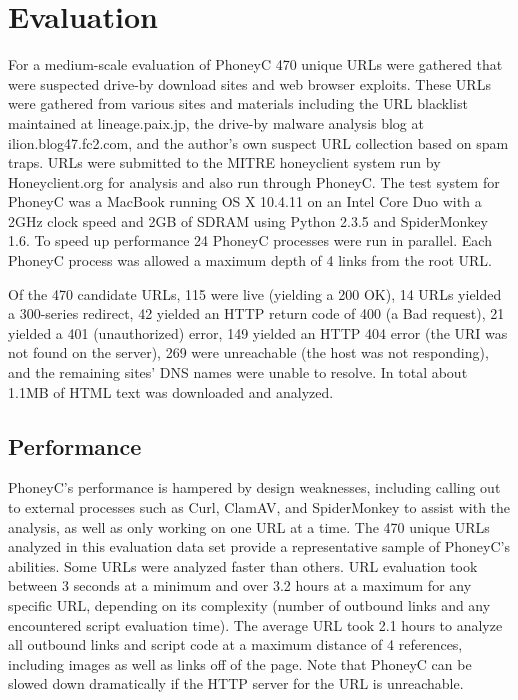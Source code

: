 \documentclass[10pt,twocolumn]{article}
\begin{document}
\section{Evaluation}
\label{evaluation}

For a medium-scale evaluation of PhoneyC 470 unique URLs were gathered that were suspected drive-by download sites and web browser exploits. These URLs were gathered from various sites and materials including the URL blacklist maintained at lineage.paix.jp, the drive-by malware analysis blog at ilion.blog47.fc2.com, and the author's own suspect URL collection based on spam traps. URLs were submitted to the MITRE honeyclient system run by Honeyclient.org for analysis and also run through PhoneyC. The test system for PhoneyC was a MacBook running OS X 10.4.11 on an Intel Core Duo with a 2GHz clock speed and 2GB of SDRAM using Python 2.3.5 and SpiderMonkey 1.6. To speed up performance 24 PhoneyC processes were run in parallel. Each PhoneyC process was allowed a maximum depth of 4 links from the root URL. 

Of the 470 candidate URLs, 115 were live (yielding a 200 OK), 14 URLs yielded a 300-series redirect, 42 yielded an HTTP return code of 400 (a Bad request), 21 yielded a 401 (unauthorized) error, 149 yielded an HTTP 404 error (the URI was not found on the server), 269 were unreachable (the host was not responding), and the remaining sites' DNS names were unable to resolve. In total about 1.1MB of HTML text was downloaded and analyzed. 

\subsection{Performance}
\label{performance}

PhoneyC's performance is hampered by design weaknesses, including calling out to external processes such as Curl, ClamAV, and SpiderMonkey to assist with the analysis, as well as only working on one URL at a time. The 470 unique URLs analyzed in this evaluation data set provide a representative sample of PhoneyC's abilities. Some URLs were analyzed faster than others. URL evaluation took between 3 seconds at a minimum and over 3.2 hours at a maximum for any specific URL, depending on its complexity (number of outbound links and any encountered script evaluation time). The average URL took 2.1 hours to analyze all outbound links and script code at a maximum distance of 4 references, including images as well as links off of the page. Note that PhoneyC can be slowed down dramatically if the HTTP server for the URL is unreachable. 
\end{document}
